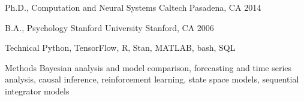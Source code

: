 \documentclass[11pt, letterpaper]{awesome-cv-resume}
\begin{document}
\vspace{2mm}

\begin{cventries}

  \cventry
    {Ph.D., Computation and Neural Systems}
    {Caltech}
    {Pasadena, CA}
    {2014}
    {}

  \cventry
    {B.A., Psychology}
    {Stanford University}
    {Stanford, CA}
    {2006}
    {}

\end{cventries}

\vspace{2mm}

\begin{cvskills}
  \cvskill
    {Technical}
    {Python, TensorFlow, R, Stan, MATLAB, bash, SQL}

  \cvskill
    {Methods}
    {Bayesian analysis and model comparison, forecasting and time series analysis, causal inference, reinforcement learning, state space models, sequential integrator models}
\end{cvskills}

\end{document}
